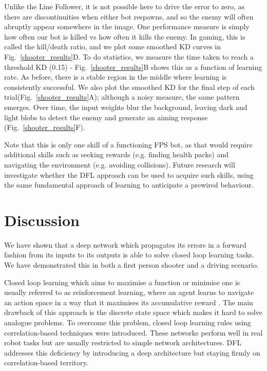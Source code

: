 \documentclass{llncs}
\begin{document}
Unlike the Line Follower, it is not possible here to drive the error
to zero, as there are discontinuities when either bot respawns, and so
the enemy will often abruptly appear somewhere in the image. One
performance measure is simply how often our bot is killed vs how often
it kills the enemy. In gaming, this is called the kill/death ratio,
and we plot some smoothed KD curves in Fig.~\ref{shooter_results}D. To
do statistics, we measure the time taken to reach a threshold KD (0.15) -
Fig.~\ref{shooter_results}B shows this as a function of learning
rate. As before, there is a stable region in the middle where learning
is consistently successful. We also plot the smoothed KD for the final
step of each trial(Fig.~\ref{shooter_results}A); although a noisy
measure, the same pattern emerges. Over time, the input weights blur
the background, leaving dark and light blobs to detect the enemy and
generate an aiming response (Fig.~\ref{shooter_results}F).

Note that this is only one skill of a functioning FPS bot, as that would
require additional skills such as seeking rewards (e.g. finding health packs) and
navigating the environment (e.g. avoiding collisions). Future research
will investigate whether the DFL approach can be used to acquire such
skills, using the same fundamental approach of learning to anticipate
a prewired behaviour.


\section{Discussion}
We have shown that a deep network which propagates its errors in a forward
fashion from its inputs to its outputs is able to solve closed loop
learning tasks. We have demonstrated this in both a first person
shooter and a driving scenario.

Closed loop learning which aims to maximise a function or minimise one
is usually referred to as reinforcement learning, where an agent learns to
navigate an action space in a way that it maximises its accumulative
reward \cite{Dayan1992}. The main drawback of this approach
is the discrete state space which makes it hard to solve analogue
problems. To overcome this problem, closed loop learning rules using
correlation-based techniques \cite{Verschure91} were introduced.
These networks perform well in real robot tasks but are usually restricted to 
simple network architectures. DFL addresses this
deficiency by introducing a deep architecture but staying firmly
on correlation-based territory.
\end{document}
